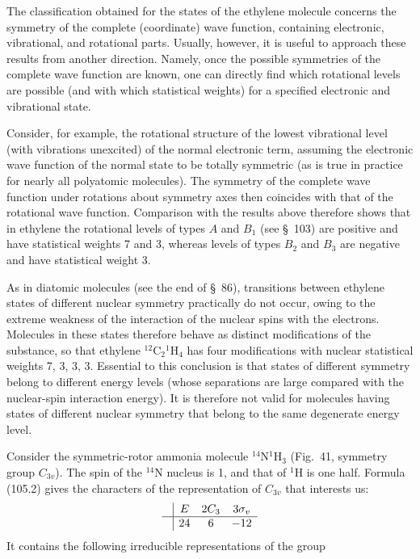 The classification obtained for the states of the ethylene molecule concerns the symmetry of the complete (coordinate) wave function, containing electronic, vibrational, and rotational parts. Usually, however, it is useful to approach these results from another direction. Namely, once the possible symmetries of the complete wave function are known, one can directly find which rotational levels are possible (and with which statistical weights) for a specified electronic and vibrational state.

Consider, for example, the rotational structure of the lowest vibrational level (with vibrations unexcited) of the normal electronic term, assuming the electronic wave function of the normal state to be totally symmetric (as is true in practice for nearly all polyatomic molecules). The symmetry of the complete wave function under rotations about symmetry axes then coincides with that of the rotational wave function. Comparison with the results above therefore shows that in ethylene the rotational levels of types $A$ and $B_1$ (see \S~103) are positive and have statistical weights 7 and 3, whereas levels of types $B_2$ and $B_3$ are negative and have statistical weight 3.

As in diatomic molecules (see the end of \S~86), transitions between ethylene states of different nuclear symmetry practically do not occur, owing to the extreme weakness of the interaction of the nuclear spins with the electrons. Molecules in these states therefore behave as distinct modifications of the substance, so that ethylene ${}^{12}\mathrm C_2{}^1\mathrm H_4$ has four modifications with nuclear statistical weights 7, 3, 3, 3. Essential to this conclusion is that states of different symmetry belong to different energy levels (whose separations are large compared with the nuclear-spin interaction energy). It is therefore not valid for molecules having states of different nuclear symmetry that belong to the same degenerate energy level.

Consider the symmetric-rotor ammonia molecule ${}^{14}\mathrm N{}^1\mathrm H_3$ (Fig.~41, symmetry group $C_{3v}$). The spin of the ${}^{14}\mathrm N$ nucleus is 1, and that of ${}^1\mathrm H$ is one half. Formula (105.2) gives the characters of the representation of $C_{3v}$ that interests us:
\[
\begin{array}{c|ccc}&E&2C_3&3\sigma_v\\\hline&24&6&-12\end{array}
\]
It contains the following irreducible representations of the group

